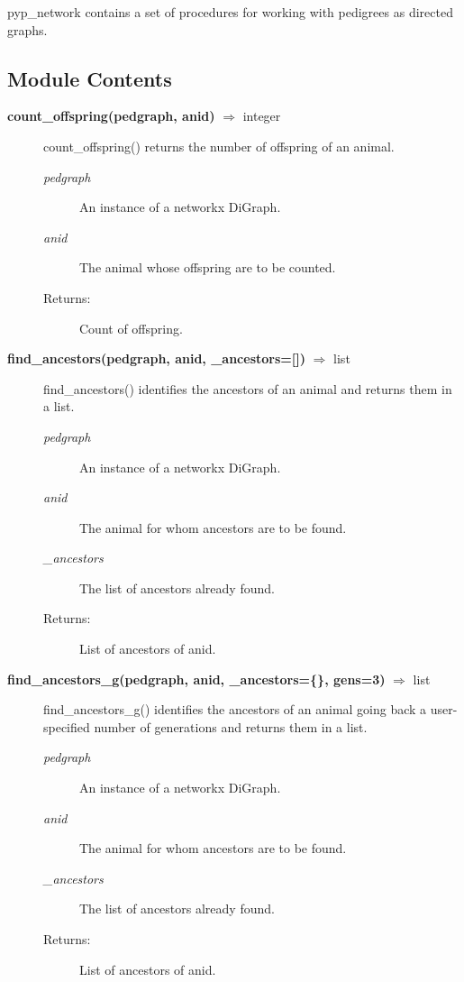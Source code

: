 pyp\_network contains a set of procedures for working with pedigrees as directed graphs.

\subsection*{Module Contents}

\begin{description}

\item[\textbf{count\_offspring(pedgraph, anid)} $\Rightarrow$ integer]
count\_offspring() returns the number of offspring of an animal.
\begin{description}
\item[\emph{pedgraph}] An instance of a networkx DiGraph.
\item[\emph{anid}] The animal whose offspring are to be counted.
\item[Returns:] Count of offspring.
\end{description}

\item[\textbf{find\_ancestors(pedgraph, anid, \_ancestors=[])} $\Rightarrow$ list]
find\_ancestors() identifies the ancestors of an animal and returns them in a list.
\begin{description}
\item[\emph{pedgraph}] An instance of a networkx DiGraph.
\item[\emph{anid}] The animal for whom ancestors are to be found.
\item[\emph{\_ancestors}] The list of ancestors already found.
\item[Returns:] List of ancestors of anid.
\end{description}

\item[\textbf{find\_ancestors\_g(pedgraph, anid, \_ancestors=\{\}, gens=3)} $\Rightarrow$ list]
find\_ancestors\_g() identifies the ancestors of an animal going back a user-specified number of generations and returns them in a list.
\begin{description}
\item[\emph{pedgraph}] An instance of a networkx DiGraph.
\item[\emph{anid}] The animal for whom ancestors are to be found.
\item[\emph{\_ancestors}] The list of ancestors already found.
\item[Returns:] List of ancestors of anid.
\end{description}


\end{description}
